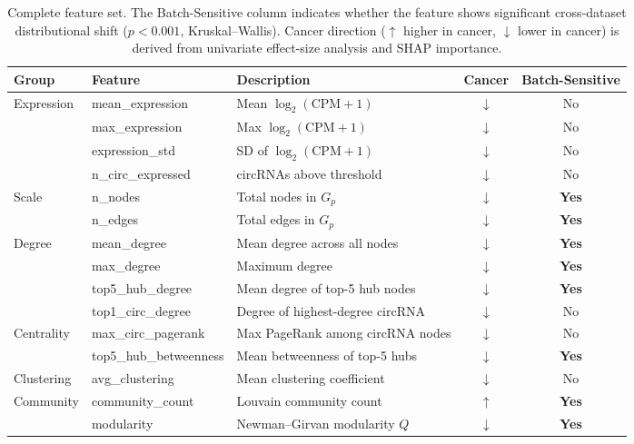 \documentclass[12pt]{article}
\begin{document}
\begin{table}[H]
\centering
\caption{Complete feature set. The Batch-Sensitive column indicates
whether the feature shows significant cross-dataset distributional
shift ($p<0.001$, Kruskal--Wallis). Cancer direction ($\uparrow$
higher in cancer, $\downarrow$ lower in cancer) is derived from
univariate effect-size analysis and SHAP importance.}
\label{tab:features}
\small
\begin{tabular}{llp{5.5cm}cc}
\toprule
Group & Feature & Description & Cancer & Batch-Sensitive \\
\midrule
\multirow{4}{*}{Expression}
 & mean\_expression    & Mean $\log_2(\text{CPM}+1)$           & $\downarrow$ & No  \\
 & max\_expression     & Max $\log_2(\text{CPM}+1)$            & $\downarrow$ & No  \\
 & expression\_std     & SD of $\log_2(\text{CPM}+1)$          & $\downarrow$ & No  \\
 & n\_circ\_expressed  & circRNAs above threshold              & $\downarrow$ & No  \\
\midrule
\multirow{2}{*}{Scale}
 & n\_nodes & Total nodes in $G_p$   & $\downarrow$ & \textbf{Yes} \\
 & n\_edges & Total edges in $G_p$   & $\downarrow$ & \textbf{Yes} \\
\midrule
\multirow{4}{*}{Degree}
 & mean\_degree       & Mean degree across all nodes          & $\downarrow$ & \textbf{Yes} \\
 & max\_degree        & Maximum degree                        & $\downarrow$ & \textbf{Yes} \\
 & top5\_hub\_degree  & Mean degree of top-5 hub nodes        & $\downarrow$ & \textbf{Yes} \\
 & top1\_circ\_degree & Degree of highest-degree circRNA      & $\downarrow$ & No  \\
\midrule
\multirow{2}{*}{Centrality}
 & max\_circ\_pagerank      & Max PageRank among circRNA nodes      & $\downarrow$ & No  \\
 & top5\_hub\_betweenness   & Mean betweenness of top-5 hubs        & $\downarrow$ & \textbf{Yes} \\
\midrule
Clustering & avg\_clustering & Mean clustering coefficient           & $\downarrow$ & No  \\
\midrule
\multirow{2}{*}{Community}
 & community\_count & Louvain community count               & $\uparrow$   & \textbf{Yes} \\
 & modularity       & Newman--Girvan modularity $Q$         & $\downarrow$ & \textbf{Yes} \\

\end{tabular}
\end{table}
\end{document}
